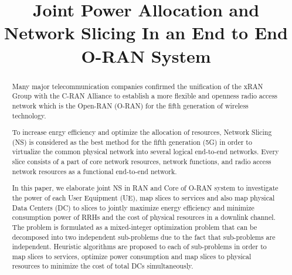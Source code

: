 \documentclass[conference]{IEEEtran}
\begin{document}
\title{Joint Power Allocation and Network Slicing In an End to End O-RAN System
}

\author{
\and
{}
\and
{}

}

\maketitle

\begin{abstract}
Many major telecommunication companies confirmed the unification of the xRAN Group with the C-RAN Alliance to establish a more flexible and openness radio access network which is the Open-RAN 
(O-RAN) for the fifth generation of wireless technology. 


To increase enrgy efficiency and optimize the allocation of resources, Network Slicing (NS) is considered as the best method for the fifth generation (5G) in order to virtualize the common physical network into several logical end-to-end networks. Every slice consists of a part of core network resources, network functions, and radio access network resources as a functional end-to-end network. 


In this paper, we elaborate joint NS in RAN and Core of O-RAN system to investigate the power 
of each User Equipment (UE), map slices to services and also map physical Data Centers (DC) to slices to jointly maximize energy efficiency and minimize consumption power of RRHs and the cost of  physical resources in a downlink channel. The problem is formulated as a mixed-integer optimization problem that can be decomposed into two independent sub-problems due to the fact that sub-problems are independent. 
Heuristic algorithms are proposed to each of sub-problems in order to map slices to services, optimize power consumption and map slices to physical resources to minimize the cost of total DCs simultaneously.
\end{abstract}
\end{document}
